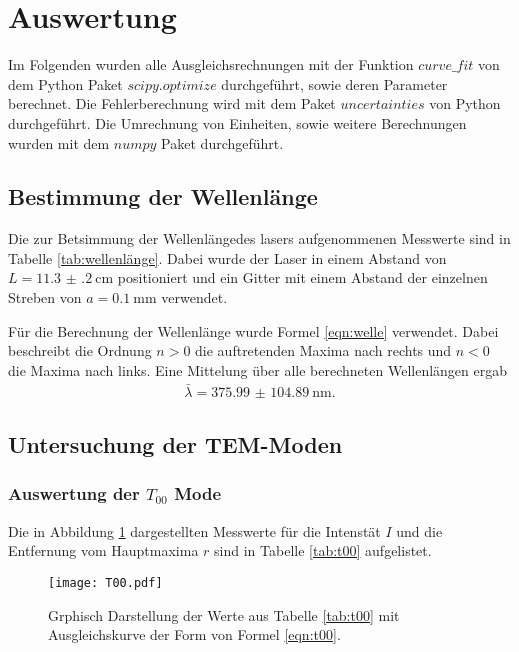 \newpage
\section{Auswertung}

\label{sec:Auswertung}
Im Folgenden wurden alle Ausgleichsrechnungen mit der Funktion $curve\_fit$ von dem
Python Paket $scipy.optimize$ \cite{scipy} durchgeführt, sowie deren Parameter
berechnet. Die Fehlerberechnung wird mit dem Paket $uncertainties$ \cite{uncertainties}
von Python durchgeführt. Die Umrechnung von Einheiten, sowie weitere Berechnungen
wurden mit dem $numpy$ Paket \cite{numpy} durchgeführt.

\subsection{Bestimmung der Wellenlänge}
Die zur Betsimmung der Wellenlängedes lasers aufgenommenen Messwerte
sind in Tabelle \ref{tab:wellenlänge}. Dabei wurde der Laser in einem Abstand
von $L = \SI{11.3(2)}{\centi\meter}$ positioniert und ein Gitter mit einem Abstand der einzelnen
Streben von $a = \SI{0.1}{\milli\meter}$ verwendet.



Für die Berechnung der Wellenlänge wurde Formel \ref{eqn:welle} verwendet. Dabei
beschreibt die Ordnung $n>0$ die auftretenden Maxima nach rechts und $n<0$ die
Maxima nach links.
Eine Mittelung über alle berechneten Wellenlängen ergab
\begin{align*}
  \bar{\lambda} = \SI{375.99(10489)}{\nano\meter}.
\end{align*}


\subsection{Untersuchung der TEM-Moden}

\subsubsection{Auswertung der $T_{00}$ Mode}
Die in Abbildung \ref{plt:t00} dargestellten Messwerte für die Intenstät $I$
und die Entfernung vom Hauptmaxima $r$ sind in Tabelle \ref{tab:t00}
aufgelistet.


\FloatBarrier

\begin{figure}[htb]
  \centering
  \texttt{[image: T00.pdf]}
  \caption{Grphisch Darstellung der Werte aus Tabelle \ref{tab:t00} mit Ausgleichskurve der Form von Formel \ref{eqn:t00}.}
  \label{plt:t00}
\end{figure}
\FloatBarrier

